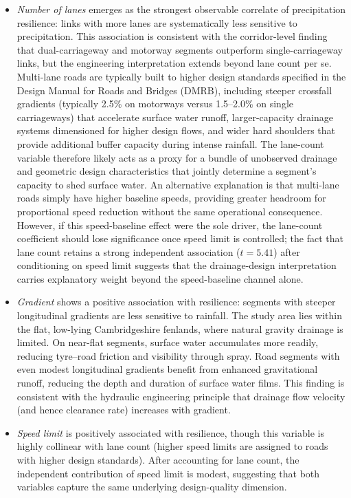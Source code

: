 \documentclass[review,authoryear]{elsarticle}
\begin{document}
\begin{itemize}[nosep]
    \item \textit{Number of lanes} emerges as the strongest observable correlate of precipitation resilience: links with more lanes are systematically less sensitive to precipitation. This association is consistent with the corridor-level finding that dual-carriageway and motorway segments outperform single-carriageway links, but the engineering interpretation extends beyond lane count per se. Multi-lane roads are typically built to higher design standards specified in the Design Manual for Roads and Bridges (DMRB), including steeper crossfall gradients (typically 2.5\% on motorways versus 1.5--2.0\% on single carriageways) that accelerate surface water runoff, larger-capacity drainage systems dimensioned for higher design flows, and wider hard shoulders that provide additional buffer capacity during intense rainfall. The lane-count variable therefore likely acts as a proxy for a bundle of unobserved drainage and geometric design characteristics that jointly determine a segment's capacity to shed surface water. An alternative explanation is that multi-lane roads simply have higher baseline speeds, providing greater headroom for proportional speed reduction without the same operational consequence. However, if this speed-baseline effect were the sole driver, the lane-count coefficient should lose significance once speed limit is controlled; the fact that lane count retains a strong independent association ($t = 5.41$) after conditioning on speed limit suggests that the drainage-design interpretation carries explanatory weight beyond the speed-baseline channel alone.
    \item \textit{Gradient} shows a positive association with resilience: segments with steeper longitudinal gradients are less sensitive to rainfall. The study area lies within the flat, low-lying Cambridgeshire fenlands, where natural gravity drainage is limited. On near-flat segments, surface water accumulates more readily, reducing tyre--road friction and visibility through spray. Road segments with even modest longitudinal gradients benefit from enhanced gravitational runoff, reducing the depth and duration of surface water films. This finding is consistent with the hydraulic engineering principle that drainage flow velocity (and hence clearance rate) increases with gradient.
    \item \textit{Speed limit} is positively associated with resilience, though this variable is highly collinear with lane count (higher speed limits are assigned to roads with higher design standards). After accounting for lane count, the independent contribution of speed limit is modest, suggesting that both variables capture the same underlying design-quality dimension.
\end{itemize}
\end{document}
